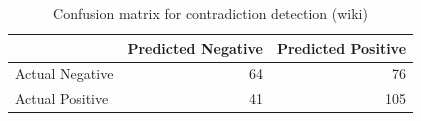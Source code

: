 \begin{table}
\caption{Confusion matrix for contradiction detection (wiki)}
\label{tab:confusion_matrix}
\begin{tabular}{lrr}
\toprule
 & Predicted Negative & Predicted Positive \\
\midrule
Actual Negative & 64 & 76 \\
Actual Positive & 41 & 105 \\
\bottomrule
\end{tabular}
\end{table}
